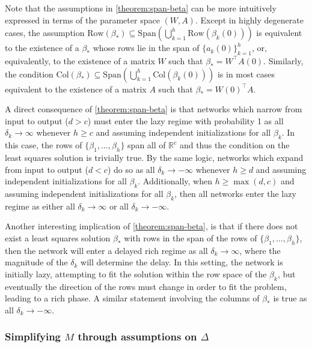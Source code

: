 \documentclass{article}
\theoremstyle{plain}
\theoremstyle{definition}
\theoremstyle{remark}
\begin{document}
Note that the assumptions in \cref{theorem:span-beta} can be more intuitively expressed in terms of the parameter space $(W, A)$. Except in highly degenerate cases, the assumption $\mathrm{Row}(\beta_*) \subseteq \mathrm{Span}\left( \bigcup_{k=1}^{h} \mathrm{Row}\left(\beta_k(0)\right) \right)$ is equivalent to the existence of a $\beta_*$ whose rows lie in the span of $\{a_k(0)\}_{k=1}^h$, or, equivalently, to the existence of a matrix $W$ such that $\beta_* = W^\intercal A(0)$. Similarly, the condition $\mathrm{Col}(\beta_*) \subseteq \mathrm{Span}\left( \bigcup_{k=1}^{h} \mathrm{Col}\left(\beta_k(0)\right) \right)$ is in most cases equivalent to the existence of a matrix $A$ such that $\beta_* = W(0)^\intercal A$.

A direct consequence of \cref{theorem:span-beta} is that networks which narrow from input to output ($d > c$) must enter the lazy regime with probability 1 as all \(\delta_k \rightarrow \infty\) whenever $h \ge c$ and assuming independent initializations for all $\beta_k$.
%
In this case, the rows of $\{\beta_1,\dots,\beta_h\}$ span all of $\mathbb{R}^c$ and thus the condition on the least squares solution is trivially true.
%
By the same logic, networks which expand from input to output ($d < c$) do so as all \(\delta_k \to -\infty\)  whenever $h \ge d$ and assuming independent initializations for all $\beta_k$.
%
Additionally, when $h \ge \max(d,c)$ and assuming independent initializations for all $\beta_k$, then all networks enter the lazy regime as either all $\delta_k \to \infty$ or all $\delta_k \to -\infty$.


Another interesting implication of \cref{theorem:span-beta}, is that if there does not exist a least squares solution $\beta_*$ with rows in the span of the rows of $\{\beta_1,\dots,\beta_h\}$, then the network will enter a delayed rich regime as all $\delta_k \to \infty$, where the magnitude of the $\delta_k$ will determine the delay.
%
In this setting, the network is initially lazy, attempting to fit the solution within the row space of the $\beta_k$, but eventually the direction of the rows must change in order to fit the problem, leading to a rich phase.
%
A similar statement involving the columns of $\beta_*$ is true as all $\delta_k \to -\infty$.



\subsubsection{Simplifying \texorpdfstring{$M$}{} through assumptions on \texorpdfstring{$\Delta$}{}}
\label{app:simplifying-assumptions-Delta}
\end{document}

